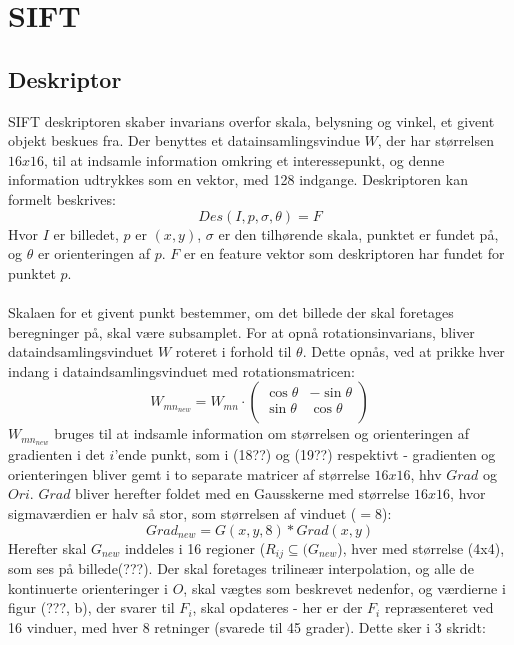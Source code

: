 \section{SIFT}


\subsection{Deskriptor}
SIFT deskriptoren skaber invarians overfor skala, belysning og vinkel, et givent objekt beskues fra. Der benyttes et datainsamlingsvindue $W$, der har størrelsen $16x16$, til at indsamle information omkring et interessepunkt, og denne information udtrykkes som en vektor, med 128 indgange. Deskriptoren kan formelt beskrives:
\begin{equation}
Des(I, p,\sigma,\theta) = F
\end{equation}
Hvor $I$ er billedet, $p$ er $(x,y)$, $\sigma$ er den tilhørende skala, punktet er fundet på, og $\theta$ er orienteringen af $p$. $F$ er en feature vektor som deskriptoren har fundet for punktet $p$.
\\
\\
Skalaen for et givent punkt bestemmer, om det billede der skal foretages beregninger på, skal være subsamplet. For at opnå rotationsinvarians, bliver dataindsamlingsvinduet $W$ roteret i forhold til $\theta$. Dette opnås, ved at prikke hver indang i dataindsamlingsvinduet med rotationsmatricen:
\begin{equation}
W_{{mn}_{new}} = W_{mn} \cdot
\begin{pmatrix}
  \cos \theta & -\sin \theta \\
  \sin \theta & \cos \theta  \\
\end{pmatrix}
\label{rotaionmatrix}
\end{equation}
$W_{{mn}_{new}}$ bruges til at indsamle information om størrelsen og orienteringen af gradienten i det $i$'ende punkt, som i (18??) og (19??) respektivt - gradienten og orienteringen bliver gemt i to separate matricer af størrelse $16x16$, hhv $Grad$ og $Ori$. $Grad$ bliver herefter foldet med en Gausskerne med størrelse $16x16$, hvor sigmaværdien er halv så stor, som størrelsen af vinduet ($=8$):
\begin{equation}
Grad_{new} = G(x,y,8) * Grad(x,y)
\label{gradientsmooth}
\end{equation}
Herefter skal $G_{new}$ inddeles i 16 regioner ($R_{ij} \subseteq (G_{new}$), hver med størrelse (4x4), som ses på billede(???). Der skal foretages trilineær interpolation, og alle de kontinuerte orienteringer i $O$, skal vægtes som beskrevet nedenfor, og værdierne i figur (???, b), der svarer til $F_i$, skal opdateres - her er der $F_i$ repræsenteret ved 16 vinduer, med hver 8 retninger (svarede til 45 grader). Dette sker i 3 skridt:
